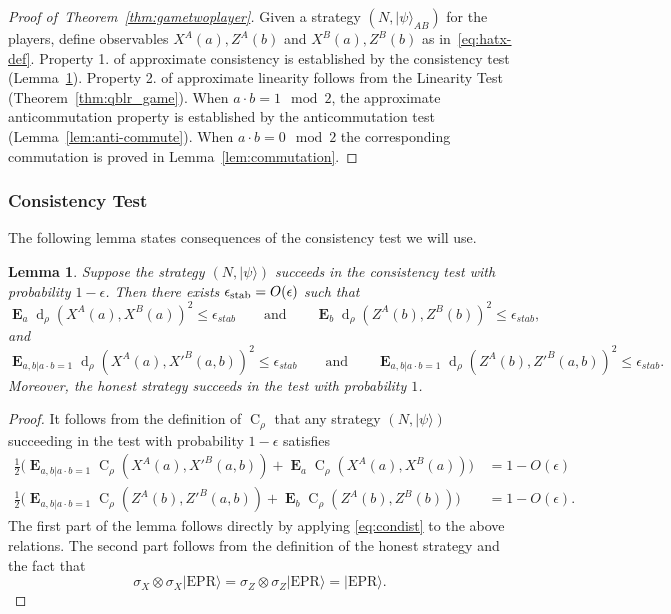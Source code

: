 \documentclass[11pt,letterpaper]{article}
\newcommand{\<}{\langle}
\renewcommand{\>}{\rangle}
\newtheorem{lemma}[theorem]{Lemma}
\newcommand{\thmref}[1]{Theorem~\ref{thm:#1}}
\newcommand{\lemref}[1]{Lemma~\ref{lem:#1}}
\newcommand{\myeqref}[1]{\eqref{eq:#1}}
\newcommand{\ket}[1]{| #1 \>}
\newcommand{\eps}{\epsilon}
\DeclareMathOperator{\E}{\mathbf{E}}
\DeclareMathOperator{\CON}{C}
\DeclareMathOperator{\DIS}{d}
\newcommand{\stab}{\ensuremath{\rm stab}}
\newcommand{\EPR}{\mathrm{EPR}}
\begin{document}
\begin{proof}[Proof of~\thmref{gametwoplayer}]
 Given a strategy $(N,\ket{\psi}_{AB})$ for the players, define observables $X^A(a),Z^A(b)$ and $X^B(a),Z^B(b)$ as in~\eqref{eq:hatx-def}. %
  Property 1. of approximate consistency is established by the consistency test
  (\lemref{consistency}). Property 2. of approximate linearity follows from the 
  Linearity Test (\thmref{qblr_game}). When $a\cdot b = 1 \mod 2$, the
  approximate anticommutation property is
  established by the anticommutation test
  (\lemref{anti-commute}). When $a \cdot b = 0 \mod 2$ the
  corresponding commutation is proved in \lemref{commutation}.
\end{proof}


\subsubsection{Consistency Test}


The following lemma states consequences of the consistency test we will use. 

\begin{lemma}\label{lem:consistency}
Suppose the strategy $(N,\ket{\psi})$ succeeds in the consistency test with probability $1-\eps$. Then there exists $\eps_{\stab} = O(\eps)$ such that 
\[ \E_a \DIS_{\rho}(X^A(a), {X^B}(a) )^2  \leq \eps_{stab} \qquad \text{and} \qquad  \E_b \DIS_\rho({Z^A}(b), {Z^B}(b))^2 \leq \eps_{stab},\]
and
\[ \E_{a,b|a\cdot b=1} \DIS_{\rho}({{X}^A}(a), {{X'}^B}(a,b) )^2  \leq \eps_{stab} \qquad \text{and} \qquad  \E_{a,b|a\cdot b=1} \DIS_\rho({{Z}^A}(b), {{Z'}^B}(a,b))^2 \leq \eps_{stab}. \]
Moreover, the honest strategy succeeds in the test with probability
$1$. 
\end{lemma}

\begin{proof}
It follows from the definition of $\CON_\rho$ that any strategy $(N,\ket{\psi})$ succeeding in the test with probability $1 - \eps$ satisfies 
 \begin{align*}
 \frac{1}{2}\Big( \E_{a,b|a\cdot b=1} \CON_\rho({X}^A(a), {{X'}^B}(a,b)) + \E_{a} \CON_\rho({X}^A(a), {{X}^B}(a))\Big)\,  &= 1 - O(\eps) \\
\frac{1}{2}\Big(   \E_{a,b|a\cdot b=1} \CON_\rho({Z}^A(b), {{Z'}^B}(a,b))+ \E_{b} \CON_\rho({{Z}^A}(b), {{Z}^B}(b))\Big) &= 1 - O(\eps).
 \end{align*}
The first part of the lemma follows directly by applying \myeqref{condist} to the above relations. The second part follows from the definition of the honest strategy and the fact that 
$$\sigma_X \otimes \sigma_X \ket{\EPR} = \sigma_Z \otimes \sigma_Z \ket{\EPR} = \ket{\EPR}.$$ 
\end{proof}
\end{document}
